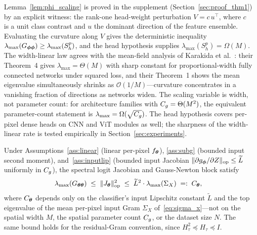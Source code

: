 \begin{remark}
Lemma~\ref{lem:phi_scaling} is proved in the supplement
(Section~\ref{sec:proof_thm1}) by an explicit witness: the rank-one
head-weight perturbation $V = c\, u^\top$, where $c$ is a unit class
contrast and $u$ the dominant direction of the feature ensemble.
Evaluating the curvature along $V$ gives the deterministic
inequality $\lambda_{\max}(G_{{\boldsymbol{\phi}}{\boldsymbol{\phi}}}) \geq
\lambda_{\max}(S_h^{p})$, and the head hypothesis supplies
$\lambda_{\max}(S_h^{p}) = \Omega(M)$. The
width-linear law agrees with the mean-field analysis of Karakida et
al.~\cite{karakida2019universal}: their Theorem~4 gives
$\lambda_{\max} = \Theta(M)$ with sharp constant for
proportional-width fully connected networks under squared loss, and
their Theorem~1 shows the mean eigenvalue simultaneously shrinks as
$\mathcal{O}(1/M)$---curvature concentrates in a vanishing fraction
of directions as networks widen. The scaling variable is width, not
parameter count: for architecture families with $C_g = \Theta(M^2)$,
the equivalent parameter-count statement is
$\lambda_{\max} = \Omega(\sqrt{C_g})$. The head hypothesis covers
per-pixel dense heads on CNN and ViT modules as well; the sharpness
of the width-linear rate is tested empirically in
Section~\ref{sec:experiments}.
\end{remark}

\begin{lemma}
\label{lem:opcap}
Under Assumptions~\ref{ass:linear} (linear per-pixel $f_{\boldsymbol{\theta}}$),
\ref{ass:subg} (bounded input second moment), and~\ref{ass:inputlip}
(bounded input Jacobian
$\|\partial g_{\boldsymbol{\phi}} / \partial Z\|_{\mathrm{op}} \leq \widetilde{L}$
uniformly in $C_g$), the spectral logit Jacobian and Gauss-Newton
block satisfy
\[
    \lambda_{\max}(G_{{\boldsymbol{\theta}}{\boldsymbol{\theta}}})
    \;\leq\; \|J_{\boldsymbol{\theta}}\|_{\mathrm{op}}^{2}
    \;\leq\; \widetilde{L}^{2} \cdot \lambda_{\max}(\Sigma_X)
    \;=:\; C_{\boldsymbol{\theta}},
\]
where $C_{\boldsymbol{\theta}}$ depends only on the classifier's input Lipschitz
constant $\widetilde{L}$ and the top eigenvalue of the mean per-pixel
input Gram $\Sigma_X$ of~\eqref{eq:sigma_x}---not on the spatial
width $M$, the spatial parameter count $C_g$, or the dataset size
$N$. The same bound holds for the residual-Gram convention, since
$H_\tau^2 \preceq H_\tau \preceq I$.
\end{lemma}

